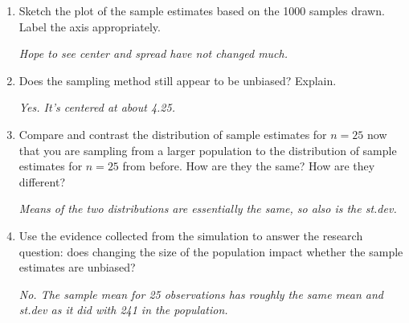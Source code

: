 \begin{enumerate}
     \item  Sketch the plot of the sample estimates based on the 1000
       samples drawn. Label the axis appropriately. 
       \begin{students}
  \vspace{3cm}
\end{students}    
\begin{key}
   {\it  Hope to see center and spread have not changed much.}
\end{key}


     \item  Does the sampling method still appear to be unbiased?
       Explain.
       \begin{students}
  \vspace{3cm}
\end{students}    
\begin{key}
   {\it  Yes.  It's centered at about 4.25.}
\end{key}

     \item Compare and contrast the distribution of sample estimates
       for $n = 25$ now that you are sampling from a larger population
       to the distribution of sample estimates for $n = 25$ from
       before. How are they the same? How are they different?
       \begin{students}
  \vspace{3cm}
\end{students}    
\begin{key}
   {\it  Means of the two distributions are essentially the same, so
     also is the st.dev.}
\end{key}

     \item Use the evidence collected from the simulation to answer
       the research question: does changing the size of the population
       impact whether the sample estimates are unbiased?
       \begin{students}
  \vspace{4cm}
\end{students}    
\begin{key}
   {\it  No.  The sample mean for 25 observations has roughly the same
     mean and st.dev as it did with 241 in the population.}
\end{key}


\end{enumerate}
